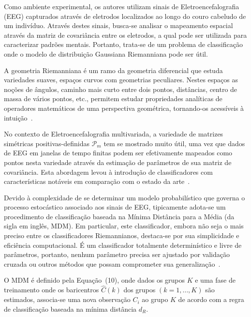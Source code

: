 \documentclass[a4paper,titlepage]{article}
\begin{document}
Como ambiente experimental, os autores utilizam sinais de Eletroencefalografia
(EEG) capturados através de eletrodos localizados ao longo do couro cabeludo de
um indivíduo. Através destes sinais, busca-se analisar o mapeamento espacial
através da matriz de covariância entre os eletrodos, a qual pode ser utilizada
para caracterizar padrões mentais. Portanto, trata-se de um problema de
classificação onde o modelo de distribuição Gaussiana Riemanniana pode ser
útil.

A geometria Riemanniana é um ramo da geometria diferencial que estuda
variedades suaves, espaços curvos com geometrias peculiares. Nestes espaços as
noções de ângulos, caminho mais curto entre dois pontos, distâncias, centro de
massa de vários pontos, etc., permitem estudar propriedades analíticas de
operadores matemáticos de uma perspectiva geométrica, tornando-os acessíveis à
intuição~\cite{levi1925lezioni,congedo2019riemannian}.

No contexto de Eletroencefalografia multivariada, a variedade de matrizes
simétricas positivas-definidas $\mathcal{P}_m$ tem se mostrado muito útil, uma
vez que dados de EEG em janelas de tempo finitas podem ser efetivamente
mapeados como pontos nesta variedade através da estimação de parâmetros de sua
matriz de covariância. Esta abordagem levou à introdução de classificadores com
características notáveis em comparação com o estado da
arte~\cite{congedo2019riemannian}.

Devido à complexidade de se determinar um modelo probabilístico que governa
o processo estocástico associado aos sinais de EEG, tipicamente adota-se um
procedimento de classificação baseada na Mínima Distância para a Média (da
sigla em inglês, MDM). Em particular, este classificador, embora não seja o mais
preciso entre os classificadores Riemannianos, destaca-se por sua simplicidade
e eficiência computacional. É um classificador totalmente determinístico e
livre de parâmetros, portanto, nenhum parâmetro precisa ser ajustado por
validação cruzada ou outros métodos que possam comprometer sua
generalização~\cite{congedo2019riemannian}.

O MDM é definido pela Equação~(10), onde dados os grupos $K$ e uma fase de
treinamento onde os baricentros $\hat{C}(k)$ dos grupos $(k=1,\ldots,K)$ são
estimados, associa-se uma nova observação $C_i$ ao grupo $\hat{K}$ de acordo
com a regra de classificação baseada na mínima distância $d_R$.
\end{document}
